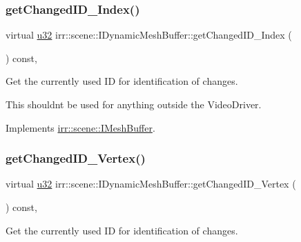 \subsubsection{\texorpdfstring{get\+Changed\+I\+D\+\_\+\+Index()}{getChangedID\_Index()}\hspace{0.1cm}{\footnotesize\ttfamily [2/2]}}
{\footnotesize\ttfamily virtual \hyperlink{namespaceirr_a0416a53257075833e7002efd0a18e804}{u32} irr\+::scene\+::\+I\+Dynamic\+Mesh\+Buffer\+::get\+Changed\+I\+D\+\_\+\+Index (\begin{DoxyParamCaption}{ }\end{DoxyParamCaption}) const\hspace{0.3cm}{\ttfamily [inline]}, {\ttfamily [virtual]}}



Get the currently used ID for identification of changes. 

This shouldn\textquotesingle{}t be used for anything outside the Video\+Driver. 

Implements \hyperlink{classirr_1_1scene_1_1IMeshBuffer_acc389d76856dfb06c3ba45a92315e6d8}{irr\+::scene\+::\+I\+Mesh\+Buffer}.

\mbox{\label{classirr_1_1scene_1_1IDynamicMeshBuffer_a3480aae22a6701453a19b4c4cbcf2555}} 
\subsubsection{\texorpdfstring{get\+Changed\+I\+D\+\_\+\+Vertex()}{getChangedID\_Vertex()}\hspace{0.1cm}{\footnotesize\ttfamily [1/2]}}
{\footnotesize\ttfamily virtual \hyperlink{namespaceirr_a0416a53257075833e7002efd0a18e804}{u32} irr\+::scene\+::\+I\+Dynamic\+Mesh\+Buffer\+::get\+Changed\+I\+D\+\_\+\+Vertex (\begin{DoxyParamCaption}{ }\end{DoxyParamCaption}) const\hspace{0.3cm}{\ttfamily [inline]}, {\ttfamily [virtual]}}



Get the currently used ID for identification of changes. 

